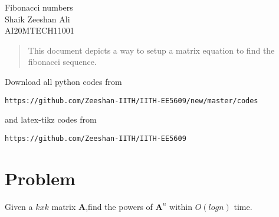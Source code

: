 \documentclass[journal,12pt,twocolumn]{IEEEtran}
\numberwithin{equation}{subsection}
\let\vec\mathbf
\begin{document}
\begin{center}
\huge Fibonacci numbers\\

\large Shaik Zeeshan Ali\\
\large AI20MTECH11001\\
\end{center}
\begin{abstract}
This document depicts a way to setup a matrix equation to find the fibonacci sequence.
\end{abstract}
Download all python codes from 
\begin{lstlisting}
https://github.com/Zeeshan-IITH/IITH-EE5609/new/master/codes
\end{lstlisting}

and latex-tikz codes from 
\begin{lstlisting}
https://github.com/Zeeshan-IITH/IITH-EE5609
\end{lstlisting}
\section{Problem}
Given a $kxk$ matrix $\vec{A}$,find the powers of $\vec{A}^n$ within $O(log n)$ time.
\end{document}
